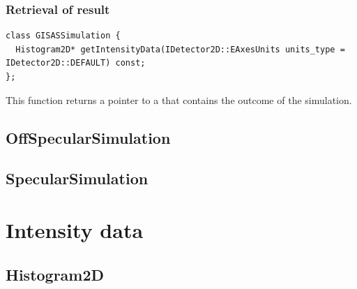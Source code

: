 \subsubsection{Retrieval of result}
\begin{lstlisting}
class GISASSimulation {
  Histogram2D* getIntensityData(IDetector2D::EAxesUnits units_type = IDetector2D::DEFAULT) const;
};
\end{lstlisting}
%
This function returns a pointer to a 
that contains the outcome of the simulation.

\subsection{Off\-Specular\-Simulation}

\MissingSection

\subsection{Specular\-Simulation}

\MissingSection

\section{Intensity data}

\MissingSection
\iffalse

\subsection{Histogram2D}\label{SRefHis2D}


